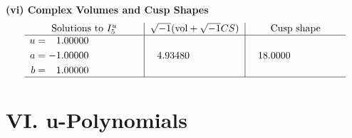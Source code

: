 \documentclass[1p]{elsarticle_modified}
\theoremstyle{definition}
\newcommand{\I}{\sqrt{-1}}
\begin{document}
\newpage\flushleft \textbf{(vi) Complex Volumes and Cusp Shapes}
$$\begin{array}{c|c|c}  
\text{Solutions to }I^u_{5}& \I (\text{vol} + \sqrt{-1}CS) & \text{Cusp shape}\\
 \hline 
\begin{aligned}
u &= \phantom{-}1.00000\phantom{ +0.000000I} \\
a &= -1.00000\phantom{ +0.000000I} \\
b &= \phantom{-}1.00000\phantom{ +0.000000I}\end{aligned}
 & \phantom{-}4.93480\phantom{ +0.000000I} & \phantom{-}18.0000\phantom{ +0.000000I}\\
 \hline 
 \end{array}$$\newpage
\newpage\renewcommand{\arraystretch}{1}
\centering \section*{ VI. u-Polynomials}
\end{document}
